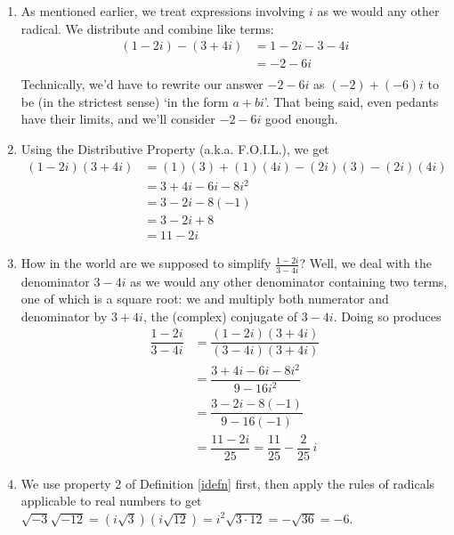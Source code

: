 {
\begin{enumerate}

\item  As mentioned earlier, we treat expressions involving $i$ as we would any other radical. We distribute and combine like terms:
\begin{align*}
 (1-2i) - (3+4i) & =   1-2i-3-4i  \tag*{Distribute} \\
                 & =   -2 - 6i  \tag*{Gather like terms} \\
\end{align*}
Technically, we'd have to rewrite our answer  $-2-6i$ as $(-2) + (-6)i$ to be (in the strictest sense) `in the form $a+bi$'. That being said, even pedants have their limits, and we'll consider $-2-6i$ good enough.

\item  Using the Distributive Property (a.k.a. F.O.I.L.), we get
\begin{align*}
  (1-2i)(3+4i)  & =  (1)(3) + (1)(4i) - (2i)(3) - (2i)(4i)  \tag*{F.O.I.L.} \\
	              & =  3+4i-6i-8i^2  \\
								& =  3 - 2i - 8(-1)  \tag*{$i^2=-1$} \\
								& =  3 - 2i + 8  \\
								& =  11 - 2i 
\end{align*}

\item  How in the world are we supposed to simplify $\frac{1-2i}{3-4i}$?  Well, we deal with the denominator $3-4i$ as we would any other denominator containing two terms, one of which is a square root: we and multiply both numerator and denominator by $3+4i$, the (complex) conjugate of $3 - 4i$.  Doing so produces
\begin{align*}
 \dfrac{1-2i}{3-4i} & =  \dfrac{(1-2i)(3+4i)}{(3-4i)(3+4i)}  \tag*{Equivalent Fractions} \\[5pt]
                    & =    \dfrac{3 + 4i - 6i - 8i^2}{9 - 16i^2}  \tag*{F.O.I.L.}\\[5pt]
					& =  \dfrac{3 - 2i - 8(-1)}{9  - 16(-1)}  \tag*{$i^2 = -1$}\\[5pt]
					& =  \dfrac{11 - 2i}{25} =  \dfrac{11}{25} - \dfrac{2}{25} \, i 
\end{align*}
										

\item  We use property 2 of Definition \ref{idefn} first, then apply the rules of radicals applicable to real numbers to get $\sqrt{-3} \sqrt{-12} = \left(i \sqrt{3}\right) \left(i \sqrt{12}\right) = i^2 \sqrt{3\cdot 12} = -\sqrt{36} = -6$.


\end{enumerate}}
